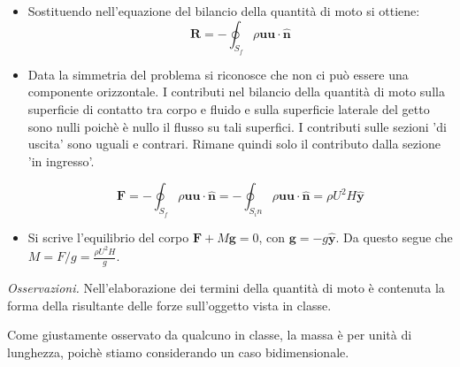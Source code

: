 \begin{itemize}
\item Sostituendo nell'equazione del bilancio della quantità di moto si ottiene:
\begin{equation}
  \bm{R} = - \oint_{S_f} \rho \bm{u} \bm{u} \cdot \hat{\bm{n}} 
\end{equation}

\item Data la simmetria del problema si riconosce che non ci può essere una componente orizzontale.
I contributi nel bilancio della quantità di moto sulla superficie di contatto tra corpo e fluido e 
sulla superficie laterale del getto sono nulli poichè è nullo il flusso su tali superfici.
I contributi sulle sezioni 'di uscita' sono uguali e contrari. Rimane quindi solo il contributo 
dalla sezione 'in ingresso'.

\begin{equation}
  \bm{F} = - \oint_{S_f} \rho \bm{u} \bm{u} \cdot \bm{\hat{n}} = 
           - \oint_{S_in} \rho \bm{u} \bm{u} \cdot \bm{\hat{n}} = 
           \rho U^2 H \bm{\hat{y}}
\end{equation}

\item Si scrive l'equilibrio del corpo $\bm{F} + M \bm{g} = 0$, con $\bm{g} = - g \bm{\hat{y}}$.
Da questo segue che $M = F/g = \frac{\rho U^2 H}{g}$.

\end{itemize}


\textit{Osservazioni.} 
Nell'elaborazione dei termini della quantità di moto è contenuta la forma della risultante delle forze sull'oggetto vista in classe.

Come giustamente osservato da qualcuno in classe, la massa è per unità di lunghezza, poichè stiamo considerando un caso bidimensionale.

